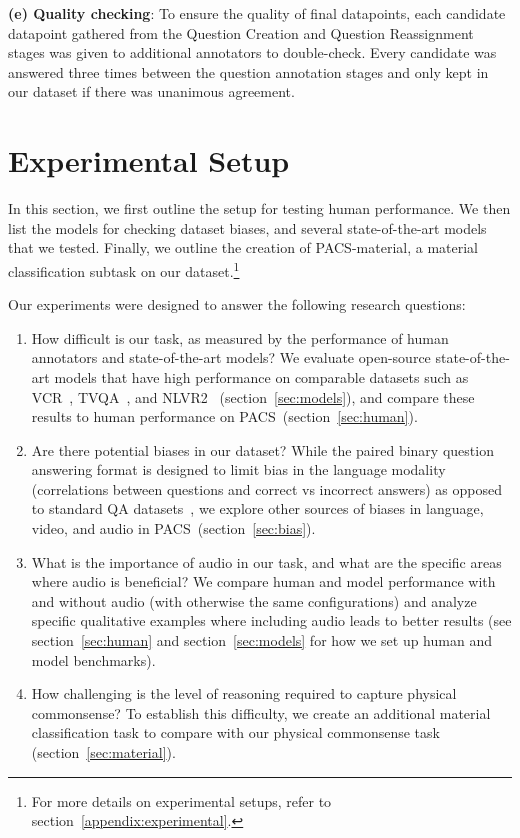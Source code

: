 \documentclass[runningheads]{llncs}
\newcommand{\names}{\textsc{PACS}}
\begin{document}
\noindent \textbf{(e) Quality checking}: To ensure the quality of final datapoints, each candidate datapoint gathered from the Question Creation and Question Reassignment stages was given to additional annotators to double-check. Every candidate was answered three times between the question annotation stages and only kept in our dataset if there was unanimous agreement.

\section{Experimental Setup}


In this section, we first outline the setup for testing human performance. We then list the models for checking dataset biases, and several state-of-the-art models that we tested. Finally, we outline the creation of \names-material, a material classification subtask on our dataset.\footnote{For more details on experimental setups, refer to section~\ref{appendix:experimental}.} 

Our experiments were designed to answer the following research questions:
\begin{enumerate}
    \item How difficult is our task, as measured by the performance of human annotators and state-of-the-art models? We evaluate open-source state-of-the-art models that have high performance on comparable datasets such as VCR~\cite{zellers2019vcr}, TVQA~\cite{lei2018tvqa}, and NLVR2~\cite{chen2020uniter} (section~\ref{sec:models}), and compare these results to human performance on \names\ (section~\ref{sec:human}).
    \item Are there potential biases in our dataset? While the paired binary question answering format is designed to limit bias in the language modality (correlations between questions and correct vs incorrect answers) as opposed to standard QA datasets~\cite{agrawal2016analyzing,anand2018blindfold,jabri2016revisiting,zadeh2019socialiq}, we explore other sources of biases in language, video, and audio in \names\ (section~\ref{sec:bias}). 
    \item What is the importance of audio in our task, and what are the specific areas where audio is beneficial? We compare human and model performance with and without audio (with otherwise the same configurations) and analyze specific qualitative examples where including audio leads to better results (see section~\ref{sec:human} and section~\ref{sec:models} for how we set up human and model benchmarks).
    \item How challenging is the level of reasoning required to capture physical commonsense? To establish this difficulty, we create an additional material classification task to compare with our physical commonsense task (section~\ref{sec:material}).
\end{enumerate}
\end{document}

